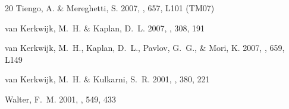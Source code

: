 \documentclass{emulateapj}\usepackage{apjfonts}
\begin{document}
\begin{thebibliography}{20}
{Tiengo}, A. \& {Mereghetti}, S. 2007, \apjl, 657, L101 (TM07)

{van Kerkwijk}, M.~H. \& {Kaplan}, D.~L. 2007, \apss, 308, 191

{van Kerkwijk}, M.~H., {Kaplan}, D.~L., {Pavlov}, G.~G., \& {Mori}, K. 2007,
  \apjl, 659, L149

{van Kerkwijk}, M.~H. \& {Kulkarni}, S.~R. 2001, \aap, 380, 221

{Walter}, F.~M. 2001, \apj, 549, 433

\end{thebibliography}
\end{document}
